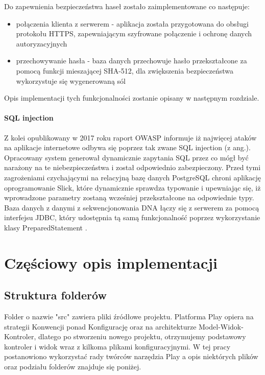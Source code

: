 \documentclass[a4paper,12pt,twoside]{article}
\begin{document}
Do zapewnienia bezpieczeństwa haseł zostało zaimplementowane co następuje:
\begin{itemize}
\item{połączenia klienta z serwerem} - aplikacja została przygotowana do obsługi protokołu HTTPS,
zapewniającym szyfrowane połączenie i ochronę danych autoryzacyjnych
\item{przechowywanie hasła - baza danych przechowuje hasło przekształcone za pomocą funkcji mieszającej SHA-512, dla zwiększenia bezpieczeństwa wykorzystuje się wygenerowaną sól 
}
\end{itemize}
Opis implementacji tych funkcjonalności zostanie opisany w następnym rozdziale.

\paragraph{SQL injection} Z kolei opublikowany w 2017 roku raport OWASP \cite{owasp}
informuje iż najwięcej ataków na aplikacje internetowe odbywa się poprzez tak zwane SQL injection (z ang.). 
Opracowany system generował dynamicznie zapytania SQL przez co mógł być narażony na te niebezpieczeństwa i został odpowiednio zabezpieczony.
Przed tymi zagrożeniami czychającymi na relacyjną bazę danych PostgreSQL chroni aplikację oprogramowanie Slick, które dynamicznie sprawdza typowanie i upewniając się, iż wprowadzone parametry
zostaną wcześniej przekształcone na odpowiednie typy.
Baza danych z danymi z sekwencjonowania DNA łączy się z serwerem za pomocą interfejsu JDBC,
który udostępnia tą samą funkcjonalność poprzez wykorzystanie klasy PreparedStatement \cite{preparedStatement}.

\newpage

\section{Częściowy opis implementacji}

\subsection{Struktura folderów}
Folder o nazwie "src" zawiera pliki źródłowe projektu.
Platforma Play opiera na strategii Konwencji ponad Konfigurację
oraz na architekturze Model-Widok-Kontroler, 
dlatego po stworzeniu nowego projektu, 
otrzymujemy podstawowy kontroler i widok wraz z kilkoma plikami konfiguracyjnymi.
W tej pracy postanowiono wykorzystać rady twórców narzędzia Play 
a opis niektórych plików oraz podziału folderów znajduje się poniżej.
\end{document}
